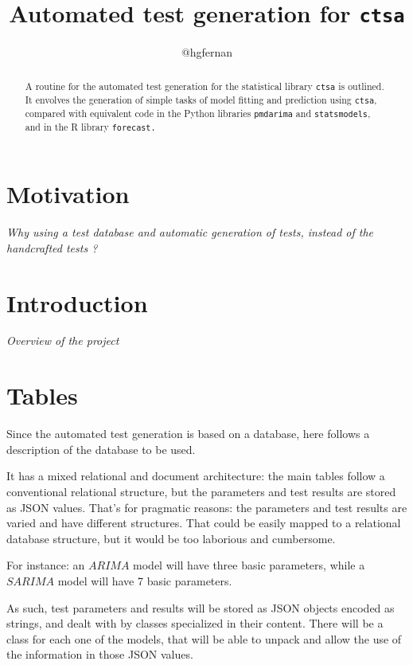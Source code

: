 \documentclass[a4paper,10pt]{article}
\title{Automated test generation for {\tt ctsa}}
\author{@hgfernan}
\begin{document}
\maketitle

\tableofcontents

\begin{abstract}
A routine for the automated test generation for the statistical
library {\tt ctsa} is outlined. It envolves the generation of
simple tasks of model fitting and prediction using {\tt ctsa},
compared with equivalent code in the Python libraries
{\tt pmdarima} and {\tt statsmodels}, and in the R library
{\tt forecast.}
\end{abstract}

\section{Motivation}
\label{sec:motiv}

{\em Why using a test database and automatic generation of
tests, instead of the handcrafted tests ?}

\section{Introduction}
\label{sec:intro}

{\em Overview of the project}

\section{Tables}
\label{sec:tables}

Since the automated test generation is based on a database, here
follows a description of the database to be used.

It has a mixed relational and document architecture: the main
tables follow a conventional relational structure, but the
parameters and test results are stored as JSON values. That's for
pragmatic reasons: the parameters and test results are varied and
have different structures. That could be easily mapped to a
relational database structure, but it would be too laborious and
cumbersome.

For instance: an $ARIMA$ model will have three basic parameters,
while a $SARIMA$ model will have 7 basic parameters.

As such, test parameters and results will be stored as JSON
objects encoded as strings, and dealt with by classes specialized
in their content. There will be a class for each one of the
models, that will be able to unpack and allow the use of the
information in those JSON values.
\end{document}
